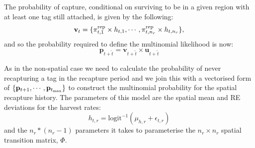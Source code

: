 \documentclass[12pt,a4paper,twoside,times,sky,standard]{csiroreport2017}
\newcommand{\ds}{\displaystyle}
\newcommand{\eps}{\epsilon}
\newcommand{\ttt}{\tilde{t}}
\newcommand{\pirep}{\pi^{\rm rep}}
\newcommand{\pp}{\mathbf{p}}
\newcommand{\uu}{\mathbf{u}}
\newcommand{\vv}{\mathbf{v}}
\newcommand{\tmax}{t_{\rm max}}
\begin{document}
The probability of capture, conditional on surviving to be in a given region with at least one tag still attached, is given by the following:
\begin{equation*}
    \ds \vv_{t} = \{\pirep_{t,1}\times h_{t,1},\cdots,\pirep_{t,n_r}\times h_{t,n_r}\}, 
\end{equation*}
and so the probability required to define the multinomial likelihood is now:
\begin{equation*}
    \ds \pp_{t+\ttt} = \vv_{t+\ttt}\times\uu_{t+\ttt}
\end{equation*}

As in the non-spatial case we need to calculate the probability of never recapturing a tag in the recapture period and we join this with a vectorised form of $\{\pp_{t+1},\cdots,\pp_{\tmax}\}$ to construct the multinomial probability for the spatial recapture history. The parameters of this model are the spatial mean and RE deviations for the harvest rates:
\begin{equation*}
    \ds h_{t,r}=\textrm{logit}^{-1}\left(\mu_{h,r}+\eps_{t,r}\right)
\end{equation*}
and the $n_r*(n_r-1)$ parameters it takes to parameterise the $n_r\times n_r$ spatial transition matrix, $\Phi$.
\end{document}

